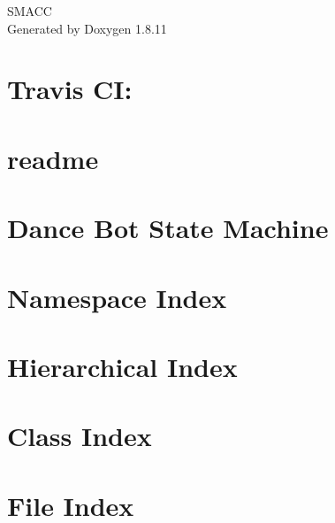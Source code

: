 \documentclass[twoside]{book}
\newcommand{\+}{\discretionary{\mbox{\scriptsize$\hookleftarrow$}}{}{}}
\newcommand{\clearemptydoublepage}{%
  \newpage{\pagestyle{empty}\cleardoublepage}%
}
\begin{document}
\hypersetup{pageanchor=false,
             bookmarksnumbered=true,
             pdfencoding=unicode
            }
\begin{titlepage}
\vspace*{7cm}
\begin{center}%
{\Large S\+M\+A\+CC }\\
\vspace*{1cm}
{\large Generated by Doxygen 1.8.11}\\
\end{center}
\end{titlepage}
\clearemptydoublepage
\tableofcontents
\clearemptydoublepage
{}
\hypersetup{pageanchor=true}

\chapter{Travis CI\+:}
\label{md_README}
\hypertarget{md_README}{}

\chapter{readme}
\label{md_smacc_diagnostics_readme}
\hypertarget{md_smacc_diagnostics_readme}{}

\chapter{Dance Bot State Machine}
\label{md_smacc_sm_reference_library_sm_dance_bot_launch_readme}
\hypertarget{md_smacc_sm_reference_library_sm_dance_bot_launch_readme}{}

\chapter{Namespace Index}

\chapter{Hierarchical Index}

\chapter{Class Index}

\chapter{File Index}

\end{document}
